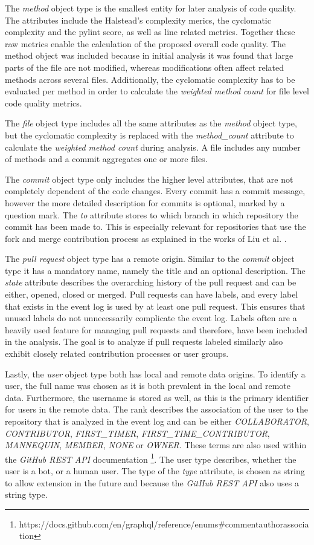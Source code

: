 The \emph{method} object type is the smallest entity for later analysis of code quality. The attributes include the Halstead's complexity merics, the cyclomatic complexity and the pylint score, as well as line related metrics. Together these raw metrics enable the calculation of the proposed overall code quality. The method object was included because in initial analysis it was found that large parts of the file are not modified, whereas modifications often affect related methods across several files. Additionally, the cyclomatic complexity has to be evaluated per method in order to calculate the \emph{weighted method count} for file level code quality metrics.

The \emph{file} object type includes all the same attributes as the \emph{method} object type, but the cyclomatic complexity is replaced with the \emph{method\_count} attribute to calculate the \emph{weighted method count} during analysis. A file includes any number of methods and a commit aggregates one or more files.

The \emph{commit} object type only includes the higher level attributes, that are not completely dependent of the code changes. Every commit has a commit message, however the more detailed description for commits is optional, marked by a question mark. The \emph{to} attribute stores to which branch in which repository the commit has been made to. This is especially relevant for repositories that use the fork and merge contribution process as explained in the works of Liu et al. \autocite{DBLP:conf/icse/Liu0MKYXGG24}.

The \emph{pull request} object type has a remote origin. Similar to the \emph{commit} object type it has a mandatory name, namely the title and an optional description. The \emph{state} attribute describes the overarching history of the pull request and can be either, opened, closed or merged. Pull requests can have labels, and every label that exists in the event log is used by at least one pull request. This ensures that unused labels do not unnecessarily complicate the event log. Labels often are a heavily used feature for managing pull requests and therefore, have been included in the analysis. The goal is to analyze if pull requests labeled similarly also exhibit closely related contribution processes or user groups. 

Lastly, the \emph{user} object type both has local and remote data origins. To identify a user, the full name was chosen as it is both prevalent in the local and remote data. Furthermore, the username is stored as well, as this is the primary identifier for users in the remote data. The rank describes the association of the user to the repository that is analyzed in the event log and can be either \emph{COLLABORATOR}, \emph{CONTRIBUTOR}, \emph{FIRST\_TIMER}, \emph{FIRST\_TIME\_CONTRIBUTOR}, \emph{MANNEQUIN}, \emph{MEMBER}, \emph{NONE} or \emph{OWNER}. These terms are also used within the \emph{GitHub REST API} documentation \footnote{https://docs.github.com/en/graphql/reference/enums\#commentauthorassociation}. The user type describes, whether the user is a bot, or a human user. The type of the \emph{type} attribute, is chosen as string to allow extension in the future and because the \emph{GitHub REST API} also uses a string type.

